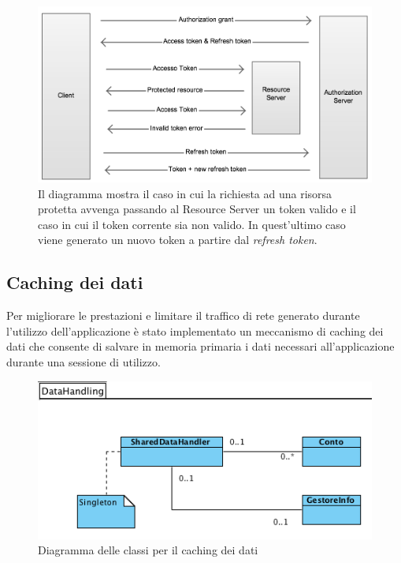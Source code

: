 \begin{figure}[!htbp]
\centering
\includegraphics[scale=0.40]{architettura/refreshToken.png}
\caption{Il diagramma mostra il caso in cui la richiesta ad una risorsa protetta avvenga passando al Resource Server un token valido e il caso in cui il token corrente sia non valido. In quest'ultimo caso viene generato un nuovo token a partire dal \emph{refresh token}. }
\label{fig:refresh}
\end{figure}

\newpage
\subsection{Caching dei dati}
Per migliorare le prestazioni e limitare il traffico di rete generato durante l'utilizzo dell'applicazione è stato implementato un meccanismo di caching dei dati che consente di salvare in memoria primaria i dati necessari all'applicazione durante una sessione di utilizzo. 

\begin{figure}[!htbp]
\centering
\includegraphics[scale=0.70]{architettura/cacheClass.png}
\caption{Diagramma delle classi per il caching dei dati}
\end{figure}

